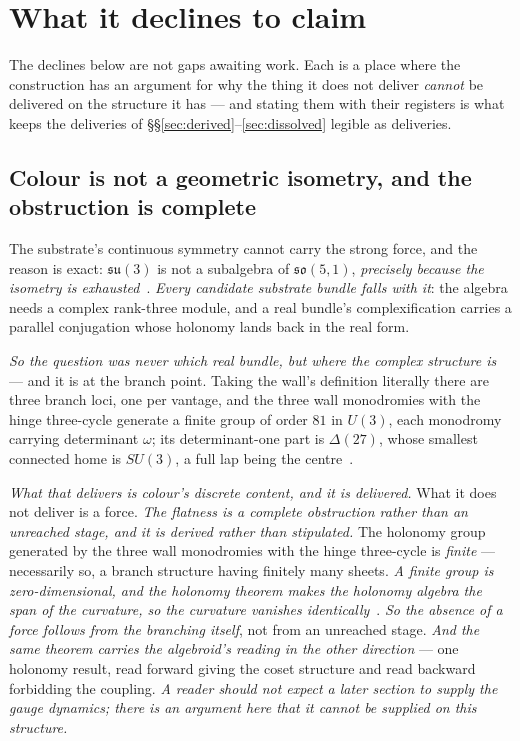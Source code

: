 \documentclass[11pt,a4paper]{article}
\theoremstyle{plain}
\theoremstyle{definition}
\begin{document}
\section{What it declines to claim}\label{sec:declined}

The declines below are not gaps awaiting work. Each is a place where the construction has an argument for
why the thing it does not deliver \emph{cannot} be delivered on the structure it has --- and stating them
with their registers is what keeps the deliveries of \S\S\ref{sec:derived}--\ref{sec:dissolved} legible as
deliveries.

\subsection{Colour is not a geometric isometry, and the obstruction is complete}

The substrate's continuous symmetry cannot carry the strong force, and the reason is exact:
$\mathfrak{su}(3)$ is not a subalgebra of $\mathfrak{so}(5,1)$, \emph{precisely because the isometry is
exhausted}~\cite{JanzenBoundary}. \emph{Every candidate substrate bundle falls with it}: the algebra needs a
complex rank-three module, and a real bundle's complexification carries a parallel conjugation whose
holonomy lands back in the real form.

\emph{So the question was never which real bundle, but where the complex structure is} --- and it is at the
branch point. Taking the wall's definition literally there are three branch loci, one per vantage, and the
three wall monodromies with the hinge three-cycle generate a finite group of order $81$ in $U(3)$, each
monodromy carrying determinant $\omega$; its determinant-one part is $\Delta(27)$, whose smallest connected
home is $SU(3)$, a full lap being the centre~\cite{JanzenMatter}.

\emph{What that delivers is colour's discrete content, and it is delivered.} What it does not deliver is a
force. \emph{The flatness is a complete obstruction rather than an unreached stage, and it is derived rather
than stipulated.} The holonomy group generated by the three wall monodromies with the hinge three-cycle is
\emph{finite} --- necessarily so, a branch structure having finitely many sheets. \emph{A finite group is
zero-dimensional, and the holonomy theorem makes the holonomy algebra the span of the curvature, so the
curvature vanishes identically}~\cite{JanzenMatter}. \emph{So the absence of a force follows from the
branching itself}, not from an unreached stage. \emph{And the same theorem carries the algebroid's
reading in the other direction} --- one holonomy result, read forward giving the coset structure and read
backward forbidding the coupling. \emph{A reader should not expect a later section to supply the gauge dynamics;
there is an argument here that it cannot be supplied on this structure.}
\end{document}
